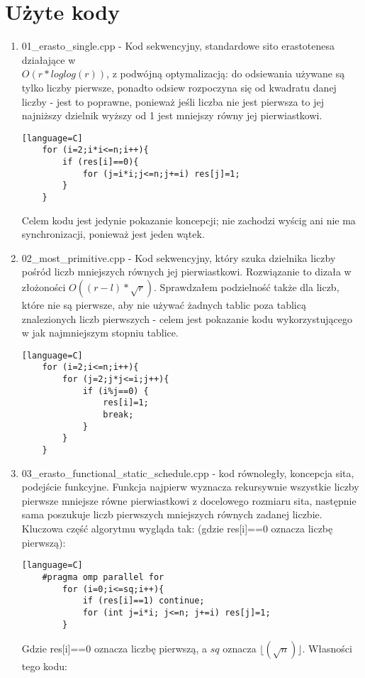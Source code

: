 \documentclass[12pt]{article}
\begin{document}
\section{Użyte kody}
\begin {enumerate}
	\item 01\_erasto\_single.cpp - Kod sekwencyjny, standardowe sito erastotenesa działające w\\ \(O(r*loglog(r))\), z podwójną optymalizacją: do odsiewania używane są tylko liczby pierwsze, ponadto odsiew rozpoczyna się od kwadratu danej liczby - jest to poprawne, ponieważ jeśli liczba nie jest pierwsza to jej najniższy dzielnik wyższy od 1 jest mniejszy równy jej pierwiastkowi.
	\begin{lstlisting}[caption= Sito Erastotenesa][language=C]
	for (i=2;i*i<=n;i++){
		if (res[i]==0){
			for (j=i*i;j<=n;j+=i) res[j]=1;
		}
	}
	\end{lstlisting}
	Celem kodu jest jedynie pokazanie koncepcji; nie zachodzi wyścig ani nie ma synchronizacji, ponieważ jest jeden wątek.
	\item 02\_most\_primitive.cpp - Kod sekwencyjny, który szuka dzielnika liczby pośród liczb mniejszych równych jej pierwiastkowi. Rozwiązanie to dizała w złożoności \(O((r-l)*\sqrt{r})\). Sprawdzałem podzielność także dla liczb, które nie są pierwsze, aby nie używać żadnych tablic poza tablicą znalezionych liczb pierwszych - celem jest pokazanie kodu wykorzystującego w jak najmniejszym stopniu tablice.
	\begin{lstlisting}[caption= Rozwiązanie pierwiastkowe][language=C]
	for (i=2;i<=n;i++){
		for (j=2;j*j<=i;j++){
			if (i%j==0) {
				res[i]=1;
				break;
			}
		}
	}
	\end{lstlisting}
	\item 03\_erasto\_functional\_static\_schedule.cpp - kod równoległy, koncepcja sita, podejście funkcyjne. Funkcja najpierw wyznacza rekursywnie wszystkie liczby pierwsze mniejsze równe pierwiastkowi z docelowego rozmiaru sita, następnie sama poszukuje liczb pierwszych mniejszych równych zadanej liczbie. Kluczowa część algorytmu wygląda tak: (gdzie res[i]==0 oznacza liczbę pierwszą):
	\begin{lstlisting}[caption= Sito funkcyjne ze static schedulingiem][language=C]
	#pragma omp parallel for
		for (i=0;i<=sq;i++){
			if (res[i]==1) continue;
			for (int j=i*i; j<=n; j+=i) res[j]=1;
		}
	\end{lstlisting}
	Gdzie res[i]==0 oznacza liczbę pierwszą, a \(sq\) oznacza \(\lfloor(\sqrt{n})\rfloor\). Własności tego kodu:

\end{enumerate}
\end{document}
